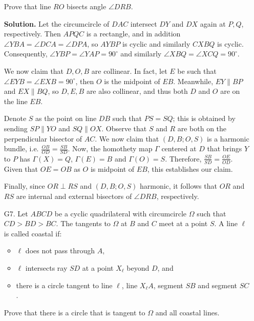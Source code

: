 \documentclass[11pt,a4paper]{article}
\begin{document}
\begin{enumerate}
        Prove that line $RO$ bisects angle $\angle DRB$.
        
        \textbf{Solution.} 
        Let the circumcircle of $DAC$ intersect $DY$ and $DX$ again at $P, Q$, respectively. 
        Then $APQC$ is a rectangle, 
        and in addition $\angle YBA=\angle DCA=\angle DPA$, 
        so $AYBP$ is cyclic and similarly $CXBQ$ is cyclic. 
        Consequently, $\angle YBP=\angle YAP=90^{\circ}$ and similarly $\angle XBQ=\angle XCQ=90^{\circ}$. 
        
        We now claim that $D, O, B$ are collinear. 
        In fact, let $E$ be such that $\angle EYB=\angle EXB=90^{\circ}$, 
        then $O$ is the midpoint of $EB$. 
        Meanwhile, $EY\parallel BP$ and $EX\parallel BQ$, so 
        $D, E, B$ are also collinear, and thus both $D$ and $O$ are on the line $EB$. 
        
        Denote $S$ as the point on line $DB$ such that $PS=SQ$; 
        this is obtained by sending $SP\parallel YO$ and $SQ\parallel OX$. 
        Observe that $S$ and $R$ are both on the perpendicular bisector of $AC$. 
        We now claim that $(D, B; O, S)$ is a harmonic bundle, 
        i.e. $\frac{OB}{OD}=\frac{SB}{SD}$. 
        Now, the homothety map $\Gamma$ centered at $D$ that brings $Y$ to $P$ has $\Gamma(X)=Q$, $\Gamma(E)=B$ and $\Gamma(O)=S$. 
        Therefore, $\frac{SB}{SD}=\frac{OE}{OD}$. 
        Given that $OE=OB$ as $O$ is midpoint of $EB$,  this establishes our claim. 
        
        Finally, since $OR\perp RS$ and $(D, B; O, S)$ harmonic, 
        it follows that $OR$ and $RS$ are internal and external bisectors of $\angle DRB$, respectively. 
        
        \item [G7.]
        Let $ABCD$ be a cyclic quadrilateral with circumcircle $\Omega$ such that $CD > BD > BC$. The tangents to $\Omega$ at $B$ and $C$ meet at a point $S$. A line $\ell$ is called coastal if:
        
        \begin{itemize}
          \item $\ell$ does not pass through $A$,
          \item $\ell$ intersects ray $SD$ at a point $X_\ell$ beyond $D$, and
          \item there is a circle tangent to line $\ell$, line $X_\ell A$, segment $SB$ and segment $SC$.
        \end{itemize}
        Prove that there is a circle that is tangent to $\Omega$ and all coastal lines.
        

\end{enumerate}
\end{document}
